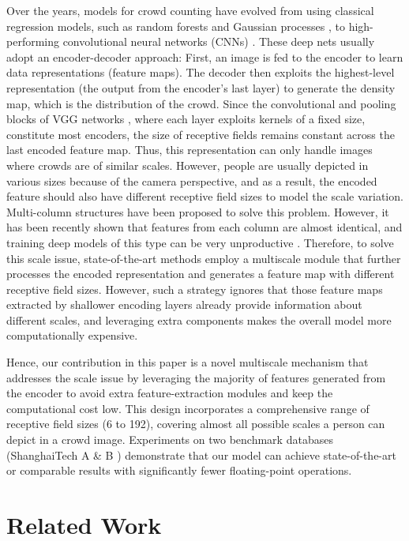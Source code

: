 \documentclass{article}
\begin{document}
Over the years, models for crowd counting have evolved from using classical regression models, such as random forests \cite{lempitsky2010learning} and Gaussian processes \cite{5459191}, to high-performing convolutional neural networks (CNNs) \cite{MCNN, CSRNet, CAN, BayesianLoss}. These deep nets usually adopt an encoder-decoder approach: First, an image is fed to the encoder to learn data representations (feature maps). The decoder then exploits the highest-level representation (the output from the encoder's last layer) to generate the density map, which is the distribution of the crowd. Since the convolutional and pooling blocks of VGG networks \cite{VGG}, where each layer exploits kernels of a fixed size, constitute most encoders, the size of receptive fields remains constant across the last encoded feature map. Thus, this representation can only handle images where crowds are of similar scales. However, people are usually depicted in various sizes because of the camera perspective, and as a result, the encoded feature should also have different receptive field sizes to model the scale variation. Multi-column structures \cite{MCNN, SANet} have been proposed to solve this problem. However, it has been recently shown that features from each column are almost identical, and training deep models of this type can be very unproductive \cite{CSRNet}. Therefore, to solve this scale issue, state-of-the-art methods \cite{CAN, M-SFANet, SMANet} employ a multiscale module that further processes the encoded representation and generates a feature map with different receptive field sizes. However, such a strategy ignores that those feature maps extracted by shallower encoding layers already provide information about different scales, and leveraging extra components makes the overall model more computationally expensive. 

Hence, our contribution in this paper is a novel multiscale mechanism that addresses the scale issue by leveraging the majority of features generated from the encoder to avoid extra feature-extraction modules and keep the computational cost low. This design incorporates a comprehensive range of receptive field sizes (6 to 192), covering 
almost all possible scales a person can depict in a crowd image. Experiments on two benchmark databases (ShanghaiTech A \& B \cite{MCNN}) demonstrate that our model can achieve state-of-the-art or comparable results with significantly fewer floating-point operations.
 
\section{Related Work}
\label{sec:related work}
\end{document}
